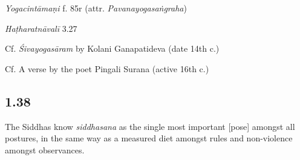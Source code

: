\begin{ekdosis}

\begin{testimonia}[hp01_037]
\emph{Yogacintāmaṇi} f. 85r (attr. \emph{Pavanayogasaṅgraha})

\begin{versinnote}
\end{versinnote}

\emph{Haṭharatnāvalī} 3.27

\begin{versinnote}
\end{versinnote}

Cf. \emph{Śivayogasāram} by Kolani Ganapatideva (date 14th c.)

\begin{versinnote}
\end{versinnote}

Cf. A verse by the poet Pingali Surana (active 16th c.)

\begin{versinnote}
\end{versinnote}

\end{testimonia}

\subsection*{1.38}
\begin{translation}[hp01_038]
The Siddhas know \emph{siddhasana} as the single most important [pose] amongst all postures, in the same way as a measured diet amongst rules and non-violence amongst observances.
\end{translation}


\end{ekdosis}
